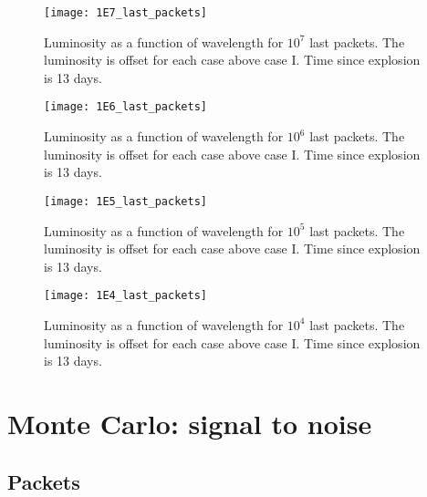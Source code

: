 \documentclass[letterpaper,12pt]{article}
\begin{document}
\begin{figure}[htpb]
  \centering
  \texttt{[image: 1E7\_last\_packets]}
  \caption{
    \label{fig:last_pack1E7}
    Luminosity as a function of wavelength for $10^7$ last packets. The luminosity is offset for each case above case I. Time since explosion is 13 days.
}
\end{figure}

\begin{figure}[htpb]
  \centering
  \texttt{[image: 1E6\_last\_packets]}
  \caption{
    \label{fig:last_pack1E6}
    Luminosity as a function of wavelength for $10^6$ last packets. The luminosity is offset for each case above case I. Time since explosion is 13 days.
}
\end{figure}

\begin{figure}[htpb]
  \centering
  \texttt{[image: 1E5\_last\_packets]}
  \caption{
    \label{fig:last_pack1E5}
    Luminosity as a function of wavelength for $10^5$ last packets. The luminosity is offset for each case above case I. Time since explosion is 13 days.
}
\end{figure}

\begin{figure}[htpb]
  \centering
  \texttt{[image: 1E4\_last\_packets]}
  \caption{
    \label{fig:last_pack1E4}
    Luminosity as a function of wavelength for $10^4$ last packets. The luminosity is offset for each case above case I. Time since explosion is 13 days.
}
\end{figure}


\clearpage
\section{\label{sec:sn} Monte Carlo: signal to noise}

\subsection{\label{sec:sn_packets}Packets}
\end{document}
